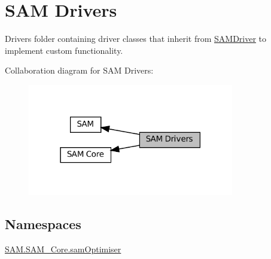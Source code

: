 \hypertarget{group__icubclient__SAM__Drivers}{}\section{S\+AM Drivers}
\label{group__icubclient__SAM__Drivers}


Drivers folder containing driver classes that inherit from \hyperlink{group__icubclient__SAM__Drivers_classSAM_1_1SAM__Core_1_1SAMDriver_1_1SAMDriver}{S\+A\+M\+Driver} to implement custom functionality.  


Collaboration diagram for S\+AM Drivers\+:
\nopagebreak
\begin{figure}[H]
\begin{center}
\leavevmode
\includegraphics[width=255pt]{group__icubclient__SAM__Drivers}
\end{center}
\end{figure}
\subsection*{Namespaces}
\begin{DoxyCompactItemize}
\item 
 \hyperlink{namespaceSAM_1_1SAM__Core_1_1samOptimiser}{S\+A\+M.\+S\+A\+M\+\_\+\+Core.\+sam\+Optimiser}
\end{DoxyCompactItemize}
